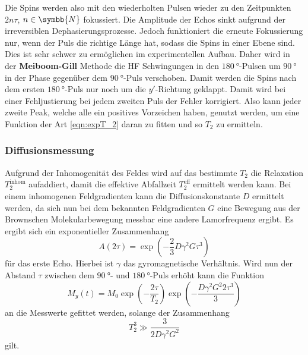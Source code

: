         \noindent Die Spins werden also mit den wiederholten Pulsen wieder zu den Zeitpunkten $2 n \tau$, $n\in \symbb{N}$ fokussiert. Die Amplitude der Echos sinkt aufgrund der irreversiblen Dephasierungsprozesse. 
        Jedoch funktioniert die erneute Fokussierung nur, wenn der Puls die richtige Länge hat, sodass die Spins in einer Ebene sind. Dies ist sehr schwer zu ermöglichen im experimentellen Aufbau. 
        Daher wird in der \textbf{Meiboom-Gill} Methode die HF Schwingungen in den $\SI{180}{\degree}$-Pulsen um $\SI{90}{\degree}$ in der Phase gegenüber dem $\SI{90}{\degree}$-Puls verschoben. 
        Damit werden die Spins nach dem ersten $\SI{180}{\degree}$-Puls nur noch um die $y'$-Richtung geklappt. Damit wird bei einer Fehljustierung bei jedem zweiten Puls der Fehler korrigiert. Also kann 
        jeder zweite Peak, welche alle ein positives Vorzeichen haben, genutzt werden, um eine Funktion der Art \eqref{eqn:expT_2} daran zu fitten und so $T_2$ zu ermitteln.
        
    \subsubsection{Diffusionsmessung}

        \noindent Aufgrund der Inhomogenität des Feldes wird auf das bestimmte $T_2$ die Relaxation $T_2^{\text{inhom}}$ aufaddiert, damit die effektive Abfallzeit $T_2^{\text{eff}}$ ermittelt werden kann. 
        Bei einem inhomogenen Feldgradienten kann die Diffusionskonstante $D$ ermittelt werden, da sich nun bei dem bekannten Feldgradienten $G$ eine Bewegung aus der Brownschen Molekularbewegung messbar eine andere Lamorfrequenz ergibt. 
        Es ergibt sich ein exponentieller Zusammenhang 
        \begin{equation*}
            A ( 2 \tau ) = \exp(-\frac{2}{3} D \gamma^2 G \tau^3)
        \end{equation*}
        für das erste Echo. Hierbei ist $\gamma$ das gyromagnetische Verhältnis. 
        Wird nun der Abstand $\tau$ zwischen dem $\SI{90}{\degree}$- und $\SI{180}{\degree}$-Puls erhöht kann die Funktion 
        \begin{equation*}
            M_y (t) = M_0 \exp\left(- \frac{2 \tau}{T_2}\right)\exp\left(- \frac{D \gamma^2 G^2 2\tau^3}{3}\right)
        \end{equation*}
        an die Messwerte gefittet werden, solange der Zusammenhang 
        \begin{equation*}
            T_2^3 \gg \frac{3}{2 D \gamma^2 G^2}
        \end{equation*}
        gilt. 


